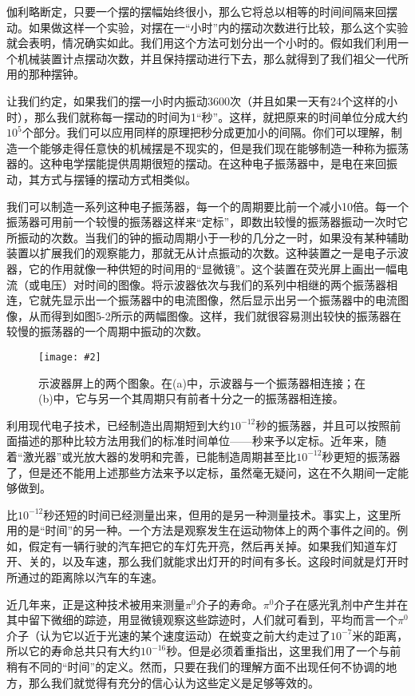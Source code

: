 \documentclass[12pt,oneside]{book}
\newenvironment{fig}[2][1]
{\begin{figure}[H]
\centering
\texttt{[image: \#2]}}
{\end{figure}}
\begin{document}
伽利略断定，只要一个摆的摆幅始终很小，那么它将总以相等的时间间隔来回摆动。如果做这样一个实验，对摆在一“小时”内的摆动次数进行比较，那么这个实验就会表明，情况确实如此。我们用这个方法可划分出一个小时的。假如我们利用一个机械装置计点摆动次数，并且保持摆动进行下去，那么就得到了我们祖父一代所用的那种摆钟。

让我们约定，如果我们的摆一小时内振动3600次（并且如果一天有24个这样的小时），那么我们就称每一摆动的时间为1“秒”。这样，就把原来的时间单位分成大约$ 10^5 $个部分。我们可以应用同样的原理把秒分成更加小的间隔。你们可以理解，制造一个能够走得任意快的机械摆是不现实的，但是我们现在能够制造一种称为振荡器的。这种电学摆能提供周期很短的摆动。在这种电子振荡器中，是电在来回振动，其方式与摆锤的摆动方式相类似。

我们可以制造一系列这种电子振荡器，每一个的周期要比前一个减小10倍。每一个振荡器可用前一个较慢的振荡器这样来“定标”，即数出较慢的振荡器振动一次时它所振动的次数。当我们的钟的振动周期小于一秒的几分之一时，如果没有某种辅助装置以扩展我们的观察能力，那就无从计点振动的次数。这种装置之一是电子示波器，它的作用就像一种供短的时间用的“显微镜”。这个装置在荧光屏上画出一幅电流（或电压）对时间的图像。将示波器依次与我们的系列中相继的两个振荡器相连，它就先显示出一个振荡器中的电流图像，然后显示出另一个振荡器中的电流图像，从而得到如图5-2所示的两幅图像。这样，我们就很容易测出较快的振荡器在较慢的振荡器的一个周期中振动的次数。
\begin{fig}[3]{示波器屏上的两个图象}
\caption{\footnotesize 示波器屏上的两个图象。在(a)中，示波器与一个振荡器相连接；在(b)中，它与另一个其周期只有前者十分之一的振荡器相连接。}
\label{fig:示波器屏上的两个图象}
\end{fig}


利用现代电子技术，已经制造出周期短到大约$ 10^{-12} $秒的振荡器，并且可以按照前面描述的那种比较方法用我们的标准时间单位——秒来予以定标。近年来，随着“激光器”或光放大器的发明和完善，已能制造周期甚至比$ 10^{-12} $秒更短的振荡器了，但是还不能用上述那些方法来予以定标，虽然毫无疑问，这在不久期间一定能够做到。

比$ 10^{-12} $秒还短的时间已经测量出来，但用的是另一种测量技术。事实上，这里所用的是“时间”的另一种。一个方法是观察发生在运动物体上的两个事件之间的。例如，假定有一辆行驶的汽车把它的车灯先开亮，然后再关掉。如果我们知道车灯开、关的，以及车速，那么我们就能求出灯开的时间有多长。这段时间就是灯开时所通过的距离除以汽车的车速。

近几年来，正是这种技术被用来测量$\pi^0$介子的寿命。$\pi^0$介子在感光乳剂中产生并在其中留下微细的踪迹，用显微镜观察这些踪迹时，人们就可看到，平均而言一个$\pi^0$介子（认为它以近于光速的某个速度运动）在蜕变之前大约走过了$ 10^{-7} $米的距离，所以它的寿命总共只有大约$ 10^{-16} $秒。但是必须着重指出，这里我们用了一个与前稍有不同的“时间”的定义。然而，只要在我们的理解方面不出现任何不协调的地方，那么我们就觉得有充分的信心认为这些定义是足够等效的。
\end{document}
